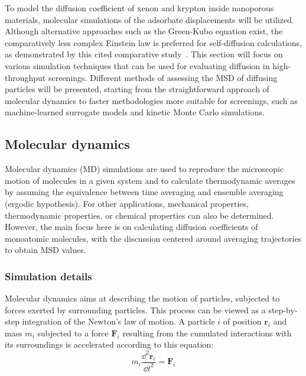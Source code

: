 \documentclass[main]{subfiles}
\begin{document}
To model the diffusion coefficient of xenon and krypton inside nanoporous materials, molecular simulations of the adsorbate displacements will be utilized. Although alternative approaches such as the Green-Kubo equation exist, the comparatively less complex Einstein law is preferred for self-diffusion calculations, as demonstrated by this cited comparative study~\cite{Maginn_2020}. This section will focus on various simulation techniques that can be used for evaluating diffusion in high-throughput screenings. Different methods of assessing the MSD of diffusing particles will be presented, starting from the straightforward approach of molecular dynamics to faster methodologies more suitable for screenings, such as machine-learned surrogate models and kinetic Monte Carlo simulations.

\subsection{Molecular dynamics}

Molecular dynamics (MD) simulations are used to reproduce the microscopic motion of molecules in a given system and to calculate thermodynamic averages by assuming the equivalence between time averaging and ensemble averaging (ergodic hypothesis). For other applications, mechanical properties, thermodynamic properties, or chemical properties can also be determined. However, the main focus here is on calculating diffusion coefficients of monoatomic molecules, with the discussion centered around averaging trajectories to obtain MSD values.

\subsubsection{Simulation details}

Molecular dynamics aims at describing the motion of particles, subjected to forces exerted by surrounding particles. This process can be viewed as a step-by-step integration of the Newton's law of motion. A particle $i$ of position $\mathbf{r}_i$ and mass $m_i$ subjected to a force $\mathbf{F}_i$ resulting from the cumulated interactions with its surroundings is accelerated according to this equation:
\begin{equation}\label{eq:newton}
  m_i\frac{\dd^2 \mathbf{r}_i}{{\dd t}^2} = \mathbf{F}_i
\end{equation}
\end{document}
